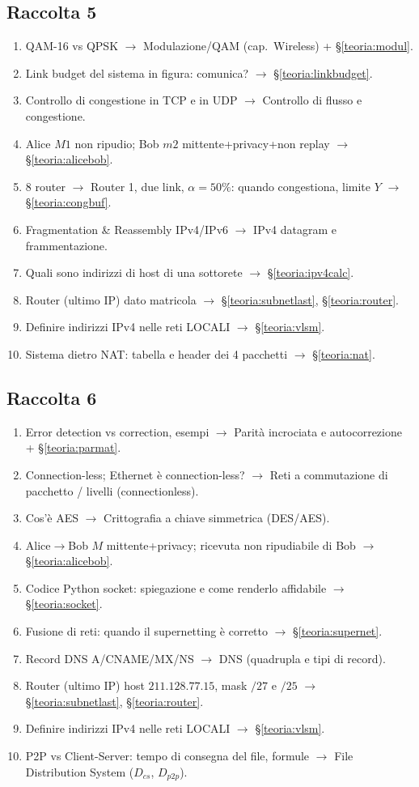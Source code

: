 \documentclass[11pt,a4paper]{report}
\begin{document}
\subsection*{Raccolta 5}
\begin{enumerate}[noitemsep]
\item QAM-16 vs QPSK $\to$ Modulazione/QAM (cap.\ Wireless) + \S\ref{teoria:modul}.
\item Link budget del sistema in figura: comunica? $\to$ \S\ref{teoria:linkbudget}.
\item Controllo di congestione in TCP e in UDP $\to$ Controllo di flusso e congestione.
\item Alice $M1$ non ripudio; Bob $m2$ mittente+privacy+non replay $\to$ \S\ref{teoria:alicebob}.
\item 8 router $\to$ Router 1, due link, $\alpha=50\%$: quando congestiona, limite $Y$ $\to$ \S\ref{teoria:congbuf}.
\item Fragmentation \& Reassembly IPv4/IPv6 $\to$ IPv4 datagram e frammentazione.
\item Quali sono indirizzi di host di una sottorete $\to$ \S\ref{teoria:ipv4calc}.
\item Router (ultimo IP) dato matricola $\to$ \S\ref{teoria:subnetlast}, \S\ref{teoria:router}.
\item Definire indirizzi IPv4 nelle reti LOCALI $\to$ \S\ref{teoria:vlsm}.
\item Sistema dietro NAT: tabella e header dei 4 pacchetti $\to$ \S\ref{teoria:nat}.
\end{enumerate}

\subsection*{Raccolta 6}
\begin{enumerate}[noitemsep]
\item Error detection vs correction, esempi $\to$ Parità incrociata e autocorrezione + \S\ref{teoria:parmat}.
\item Connection-less; Ethernet è connection-less? $\to$ Reti a commutazione di pacchetto / livelli (connectionless).
\item Cos'è AES $\to$ Crittografia a chiave simmetrica (DES/AES).
\item Alice$\to$Bob $M$ mittente+privacy; ricevuta non ripudiabile di Bob $\to$ \S\ref{teoria:alicebob}.
\item Codice Python socket: spiegazione e come renderlo affidabile $\to$ \S\ref{teoria:socket}.
\item Fusione di reti: quando il supernetting è corretto $\to$ \S\ref{teoria:supernet}.
\item Record DNS A/CNAME/MX/NS $\to$ DNS (quadrupla e tipi di record).
\item Router (ultimo IP) host $211.128.77.15$, mask $/27$ e $/25$ $\to$ \S\ref{teoria:subnetlast}, \S\ref{teoria:router}.
\item Definire indirizzi IPv4 nelle reti LOCALI $\to$ \S\ref{teoria:vlsm}.
\item P2P vs Client-Server: tempo di consegna del file, formule $\to$ File Distribution System ($D_{cs}$, $D_{p2p}$).
\end{enumerate}
\end{document}
